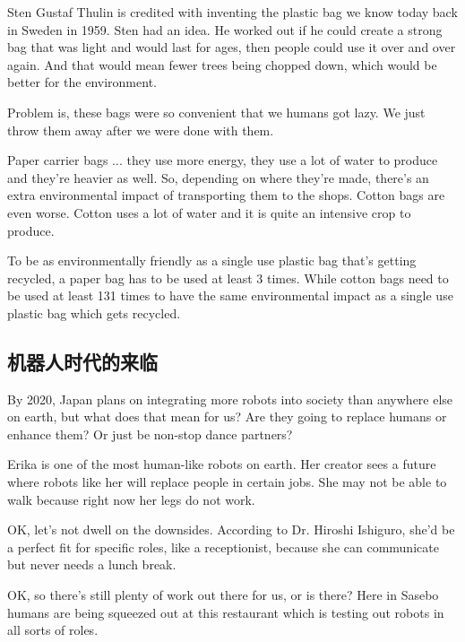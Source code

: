 Sten Gustaf Thulin is credited with inventing the plastic bag we know today back in Sweden in 1959. Sten had an idea. He worked out if he could create a strong bag that was light and would last for ages, then people could use it over and over again. And that would mean fewer trees being chopped down, which would be better for the environment.

Problem is, these bags were so convenient that we humans got lazy. We just throw them away after we were done with them.

Paper carrier bags ... they use more energy, they use a lot of water to produce and they're heavier as well. So, depending on where they're made, there's an extra environmental impact of transporting them to the shops. Cotton bags are even worse. Cotton uses a lot of water and it is quite an intensive crop to produce.

To be as environmentally friendly as a single use plastic bag that's getting recycled, a paper bag has to be used at least 3 times. While cotton bags need to be used at least 131 times to have the same environmental impact as a single use plastic bag which gets recycled.

\subsection{机器人时代的来临}
\begin{margintable}\vspace{-2cm}\footnotesize
\end{margintable}
By 2020, Japan plans on integrating more robots into society than anywhere else on earth, but what does that mean for us? Are they going to replace humans or enhance them? Or just be non-stop dance partners?

Erika is one of the most human-like robots on earth. Her creator sees a future where robots like her will replace people in certain jobs. She may not be able to walk because right now her legs do not work.

OK, let's not dwell on the downsides. According to Dr. Hiroshi Ishiguro, she'd be a perfect fit for specific roles, like a receptionist, because she can communicate but never needs a lunch break.

OK, so there's still plenty of work out there for us, or is there? Here in Sasebo humans are being squeezed out at this restaurant which is testing out robots in all sorts of roles.

